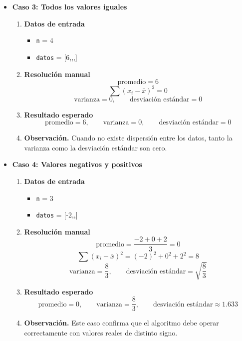 \documentclass[12pt,twoside]{book}
\begin{document}
\begin{itemize}
						
						\item \textbf{Caso 3: Todos los valores iguales}
						\begin{enumerate}
							\item \textbf{Datos de entrada}
							\begin{itemize}
								\item \texttt{n} = 4
								\item \texttt{datos} = [6,,,]
							\end{itemize}
							\item \textbf{Resolución manual}
							\[
							\text{promedio}=6
							\]
							\[
							\sum (x_i-\bar{x})^2 = 0
							\]
							\[
							\text{varianza}=0,\qquad \text{desviación estándar}=0
							\]
							\item \textbf{Resultado esperado}
							\[
							\text{promedio}=6,\qquad \text{varianza}=0,\qquad \text{desviación estándar}=0
							\]
							\item \textbf{Observación.} Cuando no existe dispersión entre los datos, tanto la varianza como la desviación estándar son cero.
						\end{enumerate}
						
						
						\item \textbf{Caso 4: Valores negativos y positivos}
						\begin{enumerate}
							\item \textbf{Datos de entrada}
							\begin{itemize}
								\item \texttt{n} = 3
								\item \texttt{datos} = [-2,,]
							\end{itemize}
							\item \textbf{Resolución manual}
							\[
							\text{promedio}=\frac{-2+0+2}{3}=0
							\]
							\[
							\sum (x_i-\bar{x})^2 = (-2)^2+0^2+2^2 = 8
							\]
							\[
							\text{varianza}=\frac{8}{3},\qquad
							\text{desviación estándar}=\sqrt{\frac{8}{3}}
							\]
							\item \textbf{Resultado esperado}
							\[
							\text{promedio}=0,\qquad \text{varianza}=\frac{8}{3},\qquad \text{desviación estándar}\approx 1.633
							\]
							\item \textbf{Observación.} Este caso confirma que el algoritmo debe operar correctamente con valores reales de distinto signo.
						\end{enumerate}
						

\end{itemize}
\end{document}
